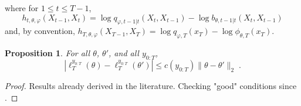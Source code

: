 \documentclass{article}
\newtheorem{proposition}[theorem]{Proposition}
\newcommand{\1}{\mathbbm{1}}
\newcommand{\eqsp}{\;}
\begin{document}
where for $1\leq t \leq T-1$, 
\begin{equation}
\label{eq:def:addfunc}
h_{t,\theta,\varphi}(X_{t-1},X_t) = \log q_{\varphi,t-1|t}(X_t,X_{t-1}) - \log b_{\theta,t-1|t}(X_t,X_{t-1})
\end{equation} 
and, by convention,  $h_{T,\theta,\varphi}(X_{T-1},X_T) = \log q_{\varphi,T}(x_T) - \log \phi_{\theta,T}(x_T)$. 
\begin{proposition}
\label{prop:loglikelihood:lipschitz}
For all $\theta$, $\theta'$, and all $y_{0:T}$,
$$
\left|\ell_T^{y_{0:T}}(\theta) - \ell_T^{y_{0:T}}(\theta')\right| \leq c(y_{0:T})\|\theta-\theta'\|_2\eqsp.
$$
\end{proposition}
\begin{proof}
Results already derived in the literature. Checking "good" conditions since \cite{douc2001asymptotics}.
\end{proof}
\end{document}
